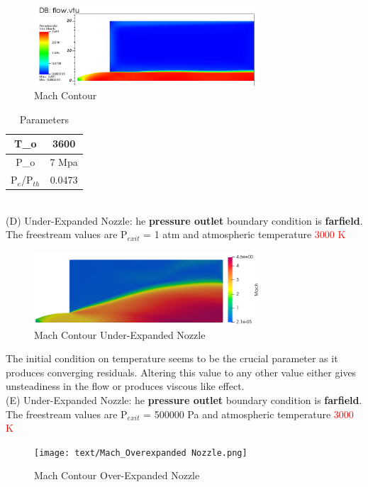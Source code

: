 \begin{figure}[H]
    \centering
    \includegraphics[width=0.75\textwidth]{text/Mach_ROE_Success.png}
    \caption[Mach Contour of Extended Mesh III]{Mach Contour}
    \label{fig:Mach Contour}
\end{figure}
\begin{table}[ht]
    \centering
    \begin{tabular}{|c|c|}
    \hline
    T_{o}  &  3600 \\
    \hline
    P_{o} & 7 Mpa\\
    \hline
    P$_{e}$/P$_{th}$ & 0.0473  \\
    \hline
    \end{tabular}
    \caption{Parameters}
    \label{tab:my_label}
\end{table}
\\
(D) Under-Expanded Nozzle: he \textbf{pressure outlet} boundary condition is \textbf{farfield}. The freestream values are P$_{exit}$ = 1 atm and atmospheric temperature \textcolor{red}{3000 K}
\begin{figure}[H]
    \centering
    \includegraphics[width=0.75\textwidth]{text/Mach_Underexpanded Nozzle.png}
    \caption{Mach Contour Under-Expanded Nozzle}
    \label{Mach Contour Under-Expanded Nozzle}
\end{figure}
The initial condition on temperature seems to be the crucial parameter as it produces converging residuals. Altering this value to any other value either gives unsteadiness in the flow or produces viscous like effect. \\

(E) Under-Expanded Nozzle: he \textbf{pressure outlet} boundary condition is \textbf{farfield}. The freestream values are P$_{exit}$ = 500000 Pa and atmospheric temperature \textcolor{red}{3000 K}
\begin{figure}[H]
    \centering
    \texttt{[image: text/Mach\_Overexpanded Nozzle.png]}
    \caption{Mach Contour Over-Expanded Nozzle}
    \label{Mach Contour Over-Expanded Nozzle}
\end{figure}

